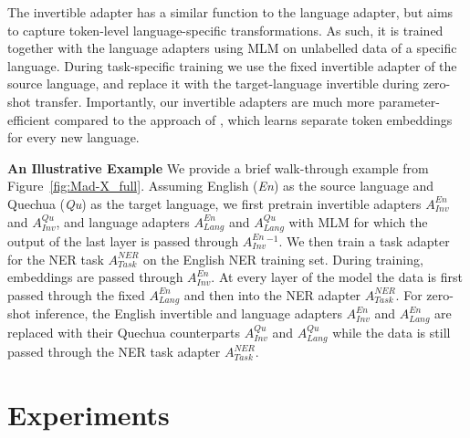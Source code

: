\documentclass[11pt,a4paper]{article}
\begin{document}
The invertible adapter has a similar function to the language adapter, but aims to capture token-level language-specific transformations. As such, it is trained together with the language adapters using MLM on unlabelled data of a specific language. During task-specific training we use the fixed invertible adapter of the source language, and replace it with the target-language invertible during zero-shot transfer. Importantly, our invertible adapters are much more parameter-efficient compared to the approach of \citet{Artetxe2020cross-lingual}, which learns separate token embeddings for every new language.

\vspace{1.8mm}
\noindent \textbf{An Illustrative Example}\hspace{1.3mm}
We  provide a brief walk-through example from Figure~\ref{fig:Mad-X_full}. Assuming English (\textit{En}) as the source language and Quechua (\textit{Qu}) as the target language, we first pretrain invertible adapters $A_{Inv}^{En}$ and $A_{Inv}^{Qu}$, and language adapters $A_{Lang}^{En}$ and $A_{Lang}^{Qu}$ with MLM for which the output of the last  layer is passed through $A_{Inv}^{En}{}^{-1}$. We then train a task adapter for the NER task $A_{Task}^{NER}$ on the English NER training set. During training, embeddings are passed through $A_{Inv}^{En}$. At every layer of the model the data is first passed through the fixed $A_{Lang}^{En}$ and then into the NER adapter $A_{Task}^{NER}$.  
For zero-shot inference, the English invertible and language adapters $A_{Inv}^{En}$ and $A_{Lang}^{En}$ are  replaced with their Quechua counterparts $A_{Inv}^{Qu}$ and $A_{Lang}^{Qu}$ while the data is still passed through the NER task adapter $A_{Task}^{NER}$. 


\section{Experiments}
\end{document}
